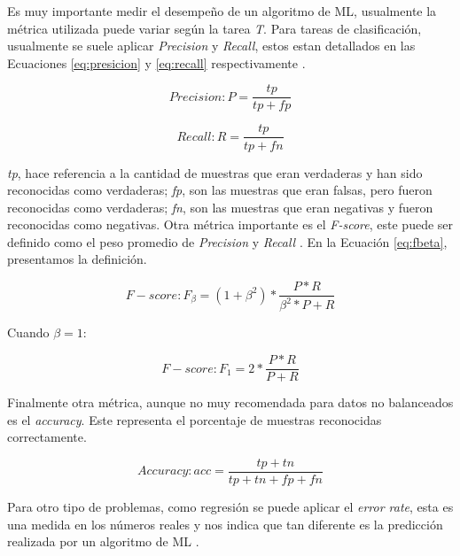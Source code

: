 Es muy importante medir el desempeño de un algoritmo de ML, usualmente la métrica utilizada puede variar según la tarea \textit{T}. Para tareas de clasificación, usualmente se suele aplicar \textit{Precision} y \textit{Recall}, estos estan detallados en las Ecuaciones \ref{eq:presicion} y \ref{eq:recall} respectivamente \citep{dalianis2018evaluation}.


\begin{equation} \label{eq:presicion}
	Precision: P = \frac{tp}{tp + fp}
\end{equation}

\begin{equation} \label{eq:recall}
	Recall: R = \frac{tp}{tp + fn}
\end{equation}

\textit{tp}, hace referencia a la cantidad de muestras que eran verdaderas y han sido reconocidas como verdaderas; \textit{fp}, son las muestras que eran falsas, pero fueron reconocidas como verdaderas; \textit{fn}, son las muestras que eran negativas y fueron reconocidas como negativas. Otra métrica importante es el \textit{F-score}, este puede ser definido como el peso promedio de \textit{Precision} y \textit{Recall}  \citep{dalianis2018evaluation}. En la Ecuación \ref{eq:fbeta}, presentamos la definición.


 
\begin{equation} \label{eq:fbeta}
	F-score: F_\beta = (1 + \beta^2) * \frac{P*R}{\beta^2*P + R}
\end{equation}

Cuando $\beta = 1$:
 
\begin{equation} \label{eq:f1}
	F-score: F_1 = 2 * \frac{P*R}{P + R}
\end{equation}

Finalmente otra métrica, aunque no muy recomendada para datos no balanceados es el \textit{accuracy}. Este representa el porcentaje de muestras reconocidas correctamente.

\begin{equation} \label{eq:f1}
	Accuracy: acc = \frac{tp + tn}{ tp +tn +fp +fn}
\end{equation}


Para otro tipo de problemas, como regresión se puede aplicar el \textit{error rate}, esta es una medida en los números reales y nos indica que tan diferente es la predicción realizada por un algoritmo de ML \cite{Goodfellow2016}.


